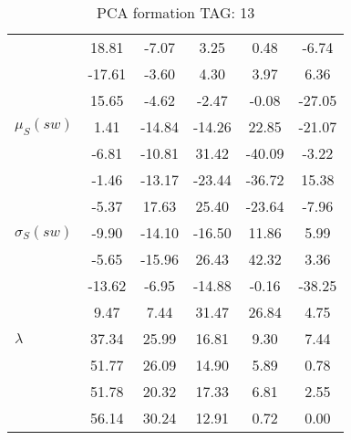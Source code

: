 \begin{table}[h!]
\begin{center}
\begin{tabular}{| l || c | c | c | c | c |}
 & 18.81  & -7.07  & 3.25  & 0.48  & -6.74 \\
 & -17.61  & -3.60  & 4.30  & 3.97  & 6.36 \\
 & 15.65  & -4.62  & -2.47  & -0.08  & -27.05 \\\hline
$\mu_S(sw)$ & 1.41  & -14.84  & -14.26  & 22.85  & -21.07 \\
 & -6.81  & -10.81  & 31.42  & -40.09  & -3.22 \\
 & -1.46  & -13.17  & -23.44  & -36.72  & 15.38 \\
 & -5.37  & 17.63  & 25.40  & -23.64  & -7.96 \\\hline
$\sigma_S(sw)$ & -9.90  & -14.10  & -16.50  & 11.86  & 5.99 \\
 & -5.65  & -15.96  & 26.43  & 42.32  & 3.36 \\
 & -13.62  & -6.95  & -14.88  & -0.16  & -38.25 \\
 & 9.47  & 7.44  & 31.47  & 26.84  & 4.75 \\\hline\hline
$\lambda$ & 37.34  & 25.99  & 16.81  & 9.30  & 7.44 \\
 & 51.77  & 26.09  & 14.90  & 5.89  & 0.78 \\
 & 51.78  & 20.32  & 17.33  & 6.81  & 2.55 \\
 & 56.14  & 30.24  & 12.91  & 0.72  & 0.00 \\\hline
\end{tabular}
\caption{PCA formation TAG: 13}
\end{center}
\end{table}